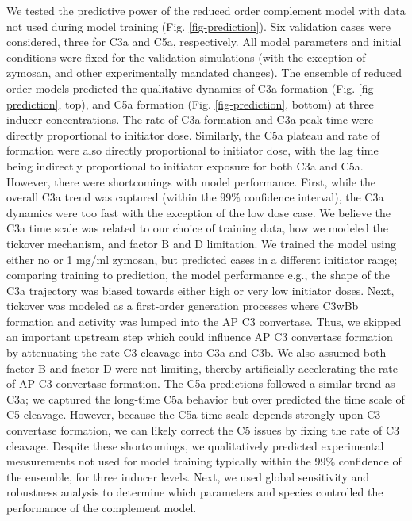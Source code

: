 \documentclass[12pt]{article}
\begin{document}
We tested the predictive power of the reduced order complement model with data not used during model training (Fig. \ref{fig-prediction}).
Six validation cases were considered, three for C3a and C5a, respectively.
All model parameters and initial conditions were fixed for the validation simulations (with the exception of zymosan, and other experimentally mandated changes).
The ensemble of reduced order models predicted the qualitative dynamics of C3a formation (Fig. \ref{fig-prediction}, top),
and C5a formation (Fig. \ref{fig-prediction}, bottom) at three inducer concentrations.
The rate of C3a formation and C3a peak time were directly proportional to initiator dose.
Similarly, the C5a plateau and rate of formation were also directly proportional to initiator dose, with the lag time being indirectly proportional to initiator exposure for both C3a and C5a.
However, there were shortcomings with model performance.
First, while the overall C3a trend was captured (within the 99\% confidence interval), the C3a dynamics were too fast with the exception of the low dose case.
We believe the C3a time scale was related to our choice of training data, how we modeled the tickover mechanism, and factor B and D limitation.
We trained the model using either no or 1 mg/ml zymosan, but predicted cases in a different initiator range;
comparing training to prediction, the model performance e.g., the shape of the C3a trajectory was biased towards either high or very low initiator doses.
Next, tickover was modeled as a first-order generation processes where C3wBb formation and activity was lumped into the AP C3 convertase.
Thus, we skipped an important upstream step which could influence AP C3 convertase formation by attenuating the rate C3 cleavage into C3a and C3b.
We also assumed both factor B and factor D were not limiting, thereby artificially accelerating the rate of AP C3 convertase formation.
The C5a predictions followed a similar trend as C3a; we captured the long-time C5a behavior but over predicted the time scale of C5 cleavage.
However, because the C5a time scale depends strongly upon C3 convertase formation, we can likely correct the C5 issues by fixing the rate of C3 cleavage.
Despite these shortcomings, we qualitatively predicted experimental measurements not used for model training typically within the 99\% confidence of the ensemble, for three inducer levels.
Next, we used global sensitivity and robustness analysis to determine which parameters and species controlled the performance of the complement model.

%
\end{document}
